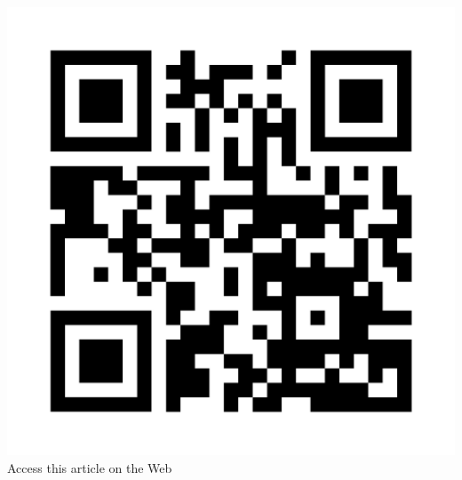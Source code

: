 \begin{center}
\includegraphics{src/Figures/tcp_QR.png}\\
{\sf Access this article on the Web}
\end{center}
